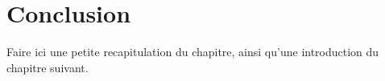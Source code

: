 \begin{spacing}{1.2}
\begin{itemize}
\end{itemize}
 
\section*{Conclusion}
Faire ici une petite recapitulation du chapitre, ainsi qu'une introduction du chapitre suivant.





\end{spacing}
